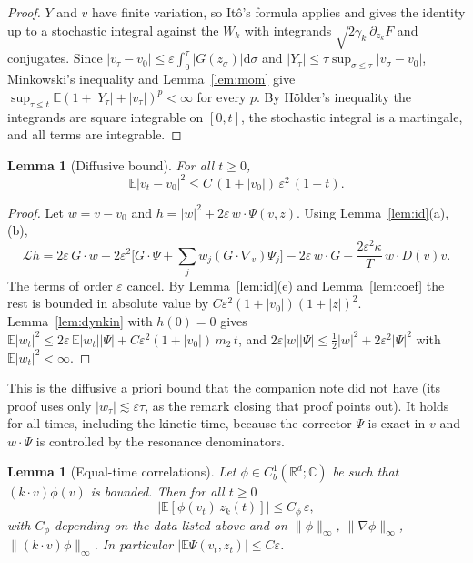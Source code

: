 \documentclass[11pt]{article}
\newcommand{\dd}{\mathrm{d}}
\newcommand{\E}{\mathbb{E}}
\newcommand{\eps}{\varepsilon}
\newcommand{\cL}{\mathcal{L}}
\newcommand{\nrm}[2]{\|#1\|_{#2}}
\newtheorem{lemma}[theorem]{Lemma}
\theoremstyle{remark}
\begin{document}
\begin{proof}
$Y$ and $v$ have finite variation, so It\^o's formula applies and gives the
identity up to a stochastic integral against the $W_k$ with integrands
$\sqrt{2\gamma_k}\,\partial_{z_k}F$ and conjugates. Since
$|v_\tau-v_0|\le\eps\int_0^\tau|G(z_\sigma)|\dd\sigma$ and
$|Y_\tau|\le\tau\sup_{\sigma\le\tau}|v_\sigma-v_0|$, Minkowski's inequality
and Lemma~\ref{lem:mom} give $\sup_{\tau\le t}\E(1+|Y_\tau|+|v_\tau|)^p<\infty$
for every $p$. By H\"older's inequality the integrands are square integrable
on $[0,t]$, the stochastic integral is a martingale, and all terms are
integrable.
\end{proof}

\begin{lemma}[Diffusive bound]\label{lem:diff}
For all $t\ge0$,
\[
  \E|v_t-v_0|^2\le C\,(1+|v_0|)\,\eps^2\,(1+t).
\]
\end{lemma}

\begin{proof}
Let $w=v-v_0$ and $h=|w|^2+2\eps\,w\cdot\Psi(v,z)$. Using
Lemma~\ref{lem:id}(a),(b),
\[
  \cL h=2\eps\,G\cdot w+2\eps^2\bigl[G\cdot\Psi+\textstyle\sum_jw_j(G\cdot\nabla_v)\Psi_j\bigr]
     -2\eps\,w\cdot G-\frac{2\eps^2\kappa}{T}\,w\cdot D(v)v .
\]
The terms of order $\eps$ cancel. By Lemma~\ref{lem:id}(e) and
Lemma~\ref{lem:coef} the rest is bounded in absolute value by
$C\eps^2(1+|v_0|)(1+|z|)^2$. Lemma~\ref{lem:dynkin} with $h(0)=0$ gives
$\E|w_t|^2\le2\eps\,\E|w_t||\Psi|+C\eps^2(1+|v_0|)\,m_2\,t$, and
$2\eps|w||\Psi|\le\frac12|w|^2+2\eps^2|\Psi|^2$ with $\E|w_t|^2<\infty$.
\end{proof}

This is the diffusive a priori bound that the companion note did not have
(its proof uses only $|w_\tau|\lesssim\eps\tau$, as the remark closing that proof points out). It holds
for all times, including the kinetic time, because the corrector $\Psi$ is
exact in $v$ and $w\cdot\Psi$ is controlled by the resonance denominators.

\begin{lemma}[Equal-time correlations]\label{lem:equal}
Let $\phi\in C_b^1(\mathbb{R}^d;\mathbb{C})$ be such that
$(k\cdot v)\phi(v)$ is bounded. Then for all $t\ge0$
\[
  \bigl|\E[\phi(v_t)\,z_k(t)]\bigr|\le C_\phi\,\eps,
\]
with $C_\phi$ depending on the data listed above and on
$\nrm{\phi}{\infty}$, $\nrm{\nabla\phi}{\infty}$,
$\nrm{(k\cdot v)\phi}{\infty}$. In particular
$|\E\Psi(v_t,z_t)|\le C\eps$.
\end{lemma}
\end{document}
